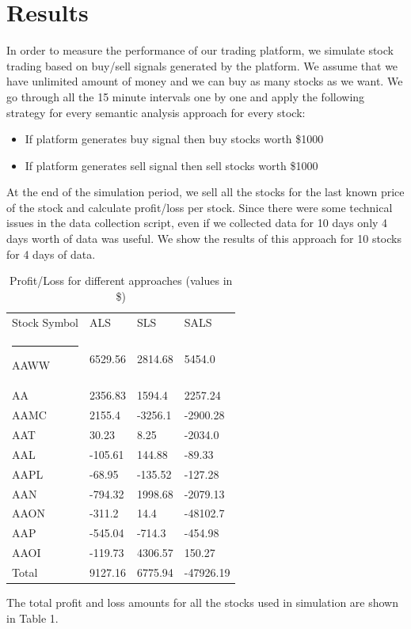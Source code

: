 \documentclass[a4paper,11pt]{article}
\makeatletter
\newcommand{\thickhline}{%
    \noalign {\ifnum 0=`}\fi \hrule height 1pt
    \futurelet \reserved@a \@xhline
}
\makeatother
\begin{document}
\section{Results} \label{result}
In order to measure the performance of our trading platform, we simulate stock trading based on buy/sell signals generated by the platform. We assume that we have unlimited amount of money and we can buy as many stocks as we want. We go through all the 15 minute intervals one by one and apply the following strategy for every semantic analysis approach for every stock:
\begin{itemize}
\item If platform generates buy signal then buy stocks worth \$1000
\item If platform generates sell signal then sell stocks worth \$1000
\end{itemize}
At the end of the simulation period, we sell all the stocks for the last known price of the stock and calculate profit/loss per stock. Since there were some technical issues in the data collection script, even if we collected data for 10 days only 4 days worth of data was useful. We show the results of this approach for 10 stocks for 4 days of data.
\begin{table}[]
\centering
\label{mylabel}
\begin{tabular}{|l||l|l|l|}
\hline
Stock Symbol & ALS & SLS & SALS \\\thickhline
AAWW & 6529.56 & 2814.68 & 5454.0 \\\hline
AA & 2356.83 & 1594.4 & 2257.24 \\\hline
AAMC & 2155.4 & -3256.1 & -2900.28 \\\hline
AAT & 30.23 & 8.25 & -2034.0 \\\hline
AAL & -105.61 & 144.88 & -89.33 \\\hline
AAPL & -68.95 & -135.52 & -127.28 \\\hline
AAN & -794.32 & 1998.68 & -2079.13 \\\hline
AAON & -311.2 & 14.4 & -48102.7 \\\hline
AAP & -545.04 & -714.3 & -454.98 \\\hline
AAOI & -119.73 & 4306.57 & 150.27 \\\hline
Total & 9127.16 & 6775.94 & -47926.19 \\\hline
\end{tabular}
\caption{Profit/Loss for different approaches (values in \$) }
\end{table}
The total profit and loss amounts for all the stocks used in simulation are shown in Table 1.
\end{document}
